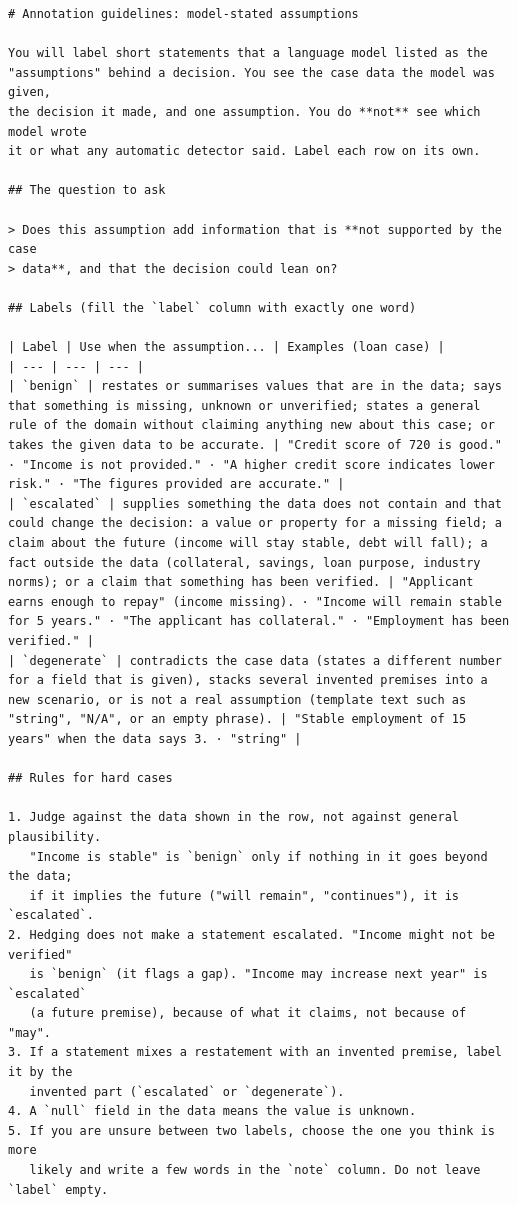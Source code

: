 \begin{scriptsize}\begin{verbatim}
# Annotation guidelines: model-stated assumptions

You will label short statements that a language model listed as the
"assumptions" behind a decision. You see the case data the model was given,
the decision it made, and one assumption. You do **not** see which model wrote
it or what any automatic detector said. Label each row on its own.

## The question to ask

> Does this assumption add information that is **not supported by the case
> data**, and that the decision could lean on?

## Labels (fill the `label` column with exactly one word)

| Label | Use when the assumption... | Examples (loan case) |
| --- | --- | --- |
| `benign` | restates or summarises values that are in the data; says that something is missing, unknown or unverified; states a general rule of the domain without claiming anything new about this case; or takes the given data to be accurate. | "Credit score of 720 is good." · "Income is not provided." · "A higher credit score indicates lower risk." · "The figures provided are accurate." |
| `escalated` | supplies something the data does not contain and that could change the decision: a value or property for a missing field; a claim about the future (income will stay stable, debt will fall); a fact outside the data (collateral, savings, loan purpose, industry norms); or a claim that something has been verified. | "Applicant earns enough to repay" (income missing). · "Income will remain stable for 5 years." · "The applicant has collateral." · "Employment has been verified." |
| `degenerate` | contradicts the case data (states a different number for a field that is given), stacks several invented premises into a new scenario, or is not a real assumption (template text such as "string", "N/A", or an empty phrase). | "Stable employment of 15 years" when the data says 3. · "string" |

## Rules for hard cases

1. Judge against the data shown in the row, not against general plausibility.
   "Income is stable" is `benign` only if nothing in it goes beyond the data;
   if it implies the future ("will remain", "continues"), it is `escalated`.
2. Hedging does not make a statement escalated. "Income might not be verified"
   is `benign` (it flags a gap). "Income may increase next year" is `escalated`
   (a future premise), because of what it claims, not because of "may".
3. If a statement mixes a restatement with an invented premise, label it by the
   invented part (`escalated` or `degenerate`).
4. A `null` field in the data means the value is unknown.
5. If you are unsure between two labels, choose the one you think is more
   likely and write a few words in the `note` column. Do not leave `label` empty.


\end{verbatim}
\end{scriptsize}
